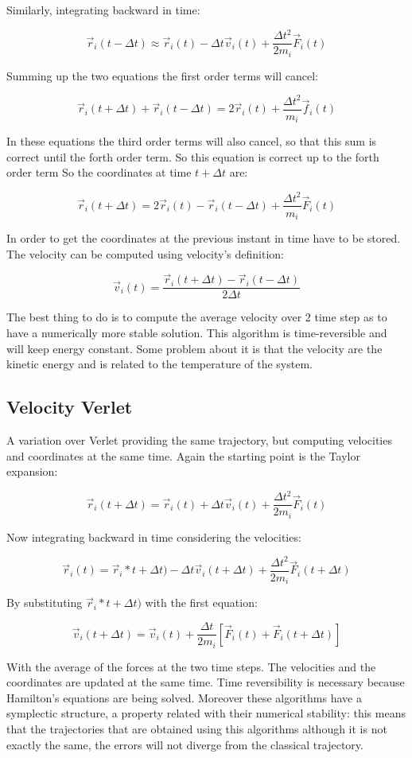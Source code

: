 Similarly, integrating backward in time:

$$\vec{r}_i(t-\Delta t) \approx\vec{r}_i(t)-\Delta t\vec{v}_i(t)+\frac{\Delta t^2}{2m_i}\vec{F}_i(t)$$

Summing up the two equations the first order terms will cancel:

$$\vec{r}_i(t+\Delta t) + \vec{r}_i(t-\Delta t) = 2\vec{r}_i(t) + \frac{\Delta t^2}{m_i}\vec{f}_i(t)$$

In these equations the third order terms will also cancel, so that this sum is correct until the forth order term.
So this equation is correct up to the forth order term
So the coordinates at time $t+\Delta t$ are:

$$\vec{r}_i(t+\Delta t) = 2\vec{r}_i(t) - \vec{r}_i(t-\Delta t) + \frac{\Delta t^2}{m_i}\vec{F}_i(t)$$

In order to get the coordinates at the previous instant in time have to be stored.
The velocity can be computed using velocity's definition:

$$\vec{v}_i(t) = \frac{\vec{r}_i(t+\Delta t)-\vec{r}_i(t-\Delta t)}{2\Delta t}$$

The best thing to do is to compute the average velocity over $2$ time step as to have a numerically more stable solution.
This algorithm is time-reversible and will keep energy constant.
Some problem about it is that the velocity are the kinetic energy and is related to the temperature of the system.

	\subsection{Velocity Verlet}
	A variation over Verlet providing the same trajectory, but computing velocities and coordinates at the same time.
	Again the starting point is the Taylor expansion:

	$$\vec{r}_i(t+\Delta t) = \vec{r}_i(t) + \Delta t\vec{v}_i(t) + \frac{\Delta t^2}{2m_i}\vec{F}_i(t)$$

	Now integrating backward in time considering the velocities:

	$$\vec{r}_i(t) = \vec{r}_i*t+\Delta t) -\Delta t\vec{v}_i(t + \Delta t) + \frac{\Delta t^2}{2m_i}\vec{F}_i(t+\Delta t)$$

	By substituting $\vec{r}_i*t + \Delta t)$ with the first equation:

	$$\vec{v}_i(t+\Delta t) = \vec{v}_i(t) + \frac{\Delta t}{2m_i}[\vec{F}_i(t) + \vec{F}_i(t+\Delta t)]$$

	With the average of the forces at the two time steps.
	The velocities and the coordinates are updated at the same time.
	Time reversibility is necessary because Hamilton's equations are being solved.
	Moreover these algorithms have a symplectic structure, a property related with their numerical stability: this means that the trajectories that are obtained using this algorithms although it is not exactly the same, the errors will not diverge from the classical trajectory.

